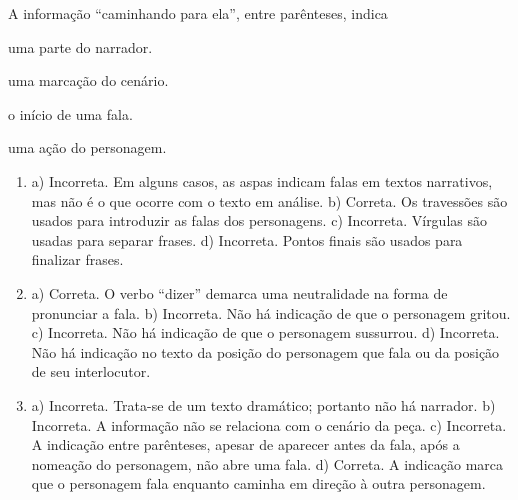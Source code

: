 
A informação “caminhando para ela”, entre parênteses, indica

\begin{minipage}{.5\textwidth}
\begin{escolha}
\item uma parte do narrador.

\item uma marcação do cenário.

\item o início de uma fala.

\item uma ação do personagem.
\end{escolha}
\end{minipage}


\begin{enumerate}\color{rosa}
\item 
a) Incorreta. Em alguns casos, as aspas indicam falas em textos narrativos, mas não é o que ocorre com o texto em análise.
b) Correta. Os travessões são usados para introduzir as falas dos
personagens.
c) Incorreta. Vírgulas são usadas para separar frases.
d) Incorreta. Pontos finais são usados para finalizar frases.

\item
a) Correta. O verbo “dizer” demarca uma neutralidade na forma de pronunciar a fala.
b) Incorreta. Não há indicação de que o personagem gritou.
c) Incorreta. Não há indicação de que o personagem sussurrou.
d) Incorreta. Não há indicação no texto da posição do personagem que fala ou da posição de seu interlocutor.


\item
a) Incorreta. Trata-se de um texto dramático; portanto não há narrador.
b) Incorreta. A informação não se relaciona com o cenário da peça.
c) Incorreta. A indicação entre parênteses, apesar de aparecer antes da fala, após a nomeação do personagem, não abre uma fala.
d) Correta. A indicação marca que o personagem fala enquanto caminha em direção à outra personagem.
\end{enumerate}

